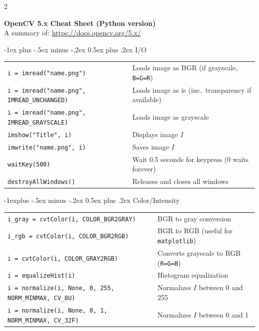 \documentclass[10pt,landscape, a4paper]{article}
\makeatletter
\renewcommand{\section}{\@startsection{section}{1}{0mm}%
                                {-1ex plus -.5ex minus -.2ex}%
                                {0.5ex plus .2ex}%
                                {\normalfont\large\bfseries}}
\renewcommand{\subsection}{\@startsection{subsection}{2}{0mm}%
                                {-1explus -.5ex minus -.2ex}%
                                {0.5ex plus .2ex}%
                                {\normalfont\normalsize\bfseries}}
\makeatother
\begin{document}
\raggedright
\footnotesize
\begin{multicols}{2}


\setlength{\premulticols}{1pt}
\setlength{\postmulticols}{1pt}
\setlength{\multicolsep}{1pt}
\setlength{\columnsep}{2pt}

\begin{center}
     \Large{\textbf{OpenCV 5.x Cheat Sheet (Python version)}} \\
     \small{A summary of: \url{https://docs.opencv.org/5.x/}}
\end{center}

\section{I/O}
\begin{tabular}{@{}ll@{}}
\texttt{i = imread("name.png")}    & Loads image as BGR (if grayscale, \texttt{B=G=R})\\
\texttt{i = imread("name.png", IMREAD_UNCHANGED)}    & Loads image as is (inc.\ transparency if available)\\
\texttt{i = imread("name.png", IMREAD_GRAYSCALE)} & Loads image as grayscale\\
\texttt{imshow("Title", i)} & Displays image $I$\\
\texttt{imwrite("name.png", i)} & Saves image $I$\\
\texttt{waitKey(500)} & Wait 0.5 seconds for keypress (0 waits forever)\\
\texttt{destroyAllWindows()} & Releases and closes all windows\\
\end{tabular}


\subsection{Color/Intensity}
\newlength{\MyLen}
\begin{tabular}{@{}ll@{}}
\texttt{i_gray = cvtColor(i, COLOR_BGR2GRAY)}& BGR to gray conversion\\
\texttt{i_rgb = cvtColor(i, COLOR_BGR2RGB)}& BGR to RGB (useful for \texttt{matplotlib})\\
\texttt{i = cvtColor(i, COLOR_GRAY2RGB)}& Converts grayscale to RGB (\texttt{R=G=B})\\
\texttt{i = equalizeHist(i)}& Histogram equalization\\
\texttt{i = normalize(i, None, 0, 255, NORM_MINMAX, CV_8U)} & Normalizes $I$ between 0 and 255\\
\texttt{i = normalize(i, None, 0, 1, NORM_MINMAX, CV_32F)} & Normalizes $I$ between 0 and 1
\end{tabular}

\end{multicols}
\end{document}
